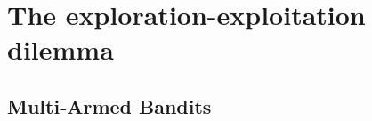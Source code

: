\documentclass[../course-notes.tex]{subfiles}
\begin{document}
\chapter{The exploration-exploitation dilemma}


\section{Multi-Armed Bandits}
\end{document}
